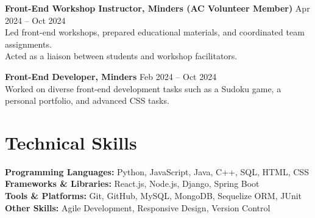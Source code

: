 \documentclass[a4paper,10pt]{article}
\begin{document}
\textbf{Front-End Workshop Instructor, Minders (AC Volunteer Member)} \hfill Apr 2024 -- Oct 2024 \\
\textbullet{}\hspace{2mm} Led front-end workshops, prepared educational materials, and coordinated team assignments.  \\
\textbullet{}\hspace{2mm} Acted as a liaison between students and workshop facilitators.

\textbf{Front-End Developer, Minders} \hfill Feb 2024 -- Oct 2024 \\
\textbullet{}\hspace{2mm} Worked on diverse front-end development tasks such as a Sudoku game, a personal portfolio, and advanced CSS tasks.


\section*{Technical Skills}
\textbf{Programming Languages:} Python, JavaScript, Java, C++, SQL, HTML, CSS \\
\textbf{Frameworks \& Libraries:} React.js, Node.js, Django, Spring Boot \\
\textbf{Tools \& Platforms:} Git, GitHub, MySQL, MongoDB, Sequelize ORM, JUnit \\
\textbf{Other Skills:} Agile Development, Responsive Design, Version Control


\end{document}
